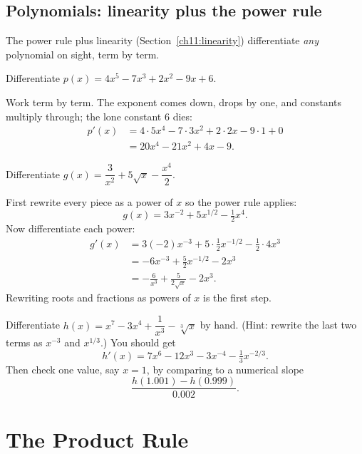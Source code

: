 \subsection{Polynomials: linearity plus the power rule}

The power rule plus linearity (Section~\ref{ch11:linearity}) differentiate \emph{any}
polynomial on sight, term by term.

\begin{example}[A polynomial]\label{ch11:ex-poly}
Differentiate $p(x) = 4x^5 - 7x^3 + 2x^2 - 9x + 6$.

Work term by term. The exponent comes down, drops by one, and constants multiply through;
the lone constant $6$ dies:
\begin{align*}
  p'(x) &= 4\cdot 5x^4 - 7\cdot 3x^2 + 2\cdot 2x - 9\cdot 1 + 0 \\
        &= 20x^4 - 21x^2 + 4x - 9.
\end{align*}
\end{example}

\begin{example}\label{ch11:ex-rewrite}
Differentiate $g(x) = \dfrac{3}{x^2} + 5\sqrt{x} - \dfrac{x^4}{2}$.

First rewrite every piece as a power of $x$ so the power rule applies:
\[
  g(x) = 3x^{-2} + 5x^{1/2} - \tfrac12 x^4 .
\]
Now differentiate each power:
\begin{align*}
  g'(x) &= 3(-2)x^{-3} + 5\cdot\tfrac12 x^{-1/2} - \tfrac12\cdot 4x^3 \\
        &= -6x^{-3} + \tfrac{5}{2}x^{-1/2} - 2x^3 \\
        &= -\frac{6}{x^3} + \frac{5}{2\sqrt{x}} - 2x^3 .
\end{align*}
Rewriting roots and fractions as powers of $x$ is the first step.
\end{example}

\begin{labbox}
Differentiate $h(x) = x^7 - 3x^4 + \dfrac{1}{x^3} - \sqrt[3]{x}$ by hand. (Hint: rewrite
the last two terms as $x^{-3}$ and $x^{1/3}$.) You should get
\[
  h'(x) = 7x^6 - 12x^3 - 3x^{-4} - \tfrac13 x^{-2/3}.
\]
Then check one value, say $x=1$, by comparing to a numerical slope
\[
  \frac{h(1.001)-h(0.999)}{0.002}.
\]
\end{labbox}

\section{The Product Rule}
\label{ch11:product-rule}

